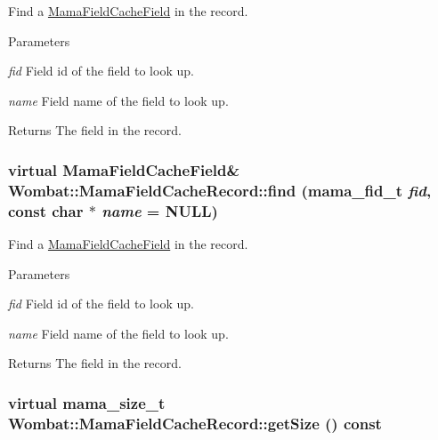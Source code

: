 Find a {\ttfamily \hyperlink{classWombat_1_1MamaFieldCacheField}{MamaFieldCacheField}} in the record. 
\begin{DoxyParams}{Parameters}
\item[{\em fid}]Field id of the field to look up. \item[{\em name}]Field name of the field to look up. \end{DoxyParams}
\begin{DoxyReturn}{Returns}
The field in the record. 
\end{DoxyReturn}
\hypertarget{classWombat_1_1MamaFieldCacheRecord_a7fa34fa26487e5fc71dc6b41c13cef30}{
\subsubsection[{find}]{\setlength{\rightskip}{0pt plus 5cm}virtual {\bf MamaFieldCacheField}\& Wombat::MamaFieldCacheRecord::find (mama\_\-fid\_\-t {\em fid}, \/  const char $\ast$ {\em name} = {\ttfamily NULL})}}
\label{classWombat_1_1MamaFieldCacheRecord_a7fa34fa26487e5fc71dc6b41c13cef30}


Find a {\ttfamily \hyperlink{classWombat_1_1MamaFieldCacheField}{MamaFieldCacheField}} in the record. 
\begin{DoxyParams}{Parameters}
\item[{\em fid}]Field id of the field to look up. \item[{\em name}]Field name of the field to look up. \end{DoxyParams}
\begin{DoxyReturn}{Returns}
The field in the record. 
\end{DoxyReturn}
\hypertarget{classWombat_1_1MamaFieldCacheRecord_a61c3ceeeab9bcbd69338bb1398bb4640}{
\subsubsection[{getSize}]{\setlength{\rightskip}{0pt plus 5cm}virtual {\bf mama\_\-size\_\-t} Wombat::MamaFieldCacheRecord::getSize () const}}
\label{classWombat_1_1MamaFieldCacheRecord_a61c3ceeeab9bcbd69338bb1398bb4640}



